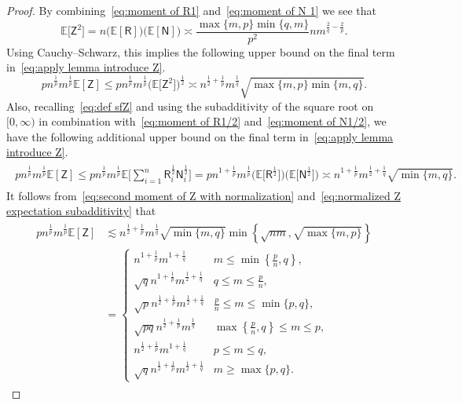 \documentclass[11pt,reqno]{amsart}
\renewcommand{\le}{\leqslant}
\renewcommand{\ge}{\geqslant}
\theoremstyle{remark}
\newcommand{\E}{\mathbb{ E}}
\renewcommand{\1}{\mathbf 1}
\newcommand{\RR}{\mathsf{R}}
\newcommand{\sfZ}{\mathsf{Z}}
\newcommand{\sfN}{\mathsf{N}}
\begin{document}
\begin{proof}
By combining~\eqref{eq:moment of R1} and~\eqref{eq:moment of N 1} we see that
$$
\E \big[\sfZ^2\big]=n\big(\E[\RR]\big)\big( \E[\sfN]\big)\asymp \frac{\max\{m,p\}\min\{q,m\}}{p^2}nm^{\frac{2}{q}-\frac{2}{p}}.
$$
Using Cauchy--Schwarz, this implies the following upper bound on the final term in~\eqref{eq:apply lemma introduce Z}.
\begin{equation}\label{eq:second moment of Z with normalization}
pn^{\frac{1}{p}}m^{\frac{1}{p}}\E[\sfZ]\le pn^{\frac{1}{p}}m^{\frac{1}{p}}\big(\E\big[\sfZ^2\big]\big)^\frac12\asymp n^{\frac12+\frac{1}{p}}m^{\frac{1}{q}}\sqrt{\max\{m,p\}\min\{m,q\}}.
\end{equation}
Also, recalling~\eqref{eq:def sfZ} and using the subadditivity of the square root on $[0,\infty)$ in combination with~\eqref{eq:moment of R1/2} and~\eqref{eq:moment of N1/2}, we have the following additional upper bound on the final term in~\eqref{eq:apply lemma introduce Z}.
\begin{align}\label{eq:normalized Z expectation subadditivity}
\begin{split}
pn^{\frac{1}{p}}m^{\frac{1}{p}}\E[\sfZ]\le pn^{\frac{1}{p}}m^{\frac{1}{p}}\E \bigg[\sum_{i=1}^n \RR_i^{\frac12}\sfN_i^{\frac12}\bigg]= pn^{1+\frac{1}{p}}m^{\frac{1}{p}}\big(\E\big[\RR^\frac12\big] \big)\big(\E\big[\sfN^\frac12\big]\big)\asymp n^{1+\frac{1}{p}}m^{\frac12+\frac{1}{q}} \sqrt{\min\{m,q\}}.
\end{split}
\end{align}
It follows from~\eqref{eq:second moment of Z with normalization} and~\eqref{eq:normalized Z expectation subadditivity} that
\begin{align}\label{eq:six case upper}
\begin{split}
pn^{\frac{1}{p}}m^{\frac{1}{p}}\E[\sfZ]&\lesssim n^{\frac12+\frac{1}{p}} m^{\frac{1}{q}}\sqrt{\min\{m,q\}} \min\left\{\sqrt{nm},\sqrt{\max\{m,p\}}\right\}\\
&=\left\{\begin{array}{ll}n^{1+\frac{1}{p}}m^{1+\frac{1}{q}}& m\le \min\left\{\frac{p}{n},q\right\},\\ \sqrt{q} n^{1+\frac{1}{p}} m^{\frac12+\frac{1}{q}} & q\le m\le \frac{p}{n},\\ \sqrt{p}n^{\frac12+\frac{1}{p}}m^{\frac12+\frac{1}{q}}&\frac{p}{n}\le m\le \min\{p,q\},\\\sqrt{pq} n^{\frac12+\frac{1}{p}}m^{\frac{1}{q}}
& \max\left\{\frac{p}{n},q\right\}\le m\le p,\\
n^{\frac12+\frac{1}{p}} m^{1+\frac{1}{q}}& p\le m\le q,\\
\sqrt{q} n^{\frac{1}{2}+\frac{1}{p}} m^{\frac{1}{2}+\frac{1}{q}} & m\ge\max\{p,q\}.
\end{array} \right.
\end{split}
\end{align}


\end{proof}
\end{document}
